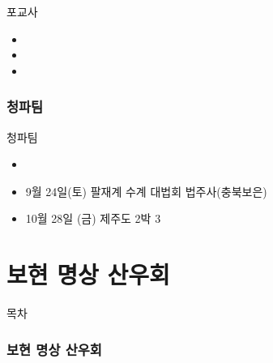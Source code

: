 \documentclass[aspectratio=1610,17pt,xcolor=pdftex,dvipsnames,table,handout]{beamer}
\begin{document}
		\begin{frame} [t,plain]
			\begin{block} {포교사}
			\begin{itemize}
				\item 
				\item 
				\item 
			\end{itemize}
			\end{block}
		\end{frame}

		\section{청파팀}

		\begin{frame} [t,plain]
			\begin{block} {청파팀}
			\begin{itemize}
				\item 
				\item 9월 24일(토) 팔재계 수계 대법회  법주사(충북보은)
				\item 10월 28일 (금)  제주도 2박 3
			\end{itemize}
			\end{block}
		\end{frame}


		\part{보현 명상 산우회}
		\frame{\partpage}


		\begin{frame} [plain]{목차}
		\tableofcontents
		\end{frame}
		



		\section{보현 명상 산우회}
\end{document}

